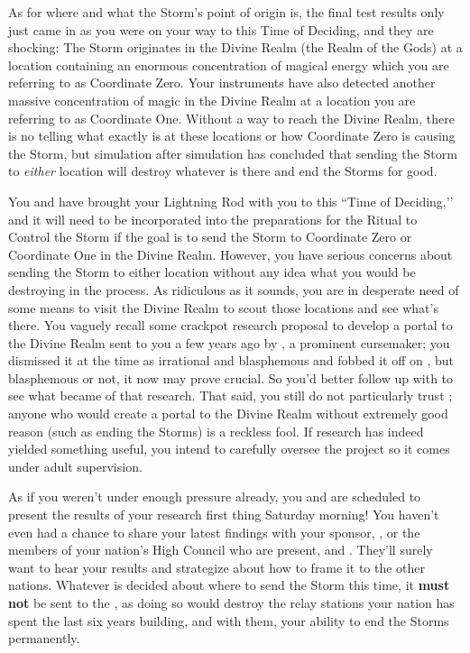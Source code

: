 \documentclass[char]{GL2020}
\begin{document}
As for where and what the Storm’s point of origin is, the final test results only just came in as you were on your way to this Time of Deciding, and they are shocking: The Storm originates in the Divine Realm (the Realm of the Gods) at a location containing an enormous concentration of magical energy which you are referring to as Coordinate Zero. Your instruments have also detected another massive concentration of magic in the Divine Realm at a location you are referring to as Coordinate One. Without a way to reach the Divine Realm, there is no telling what exactly is at these locations or how Coordinate Zero is causing the Storm, but simulation after simulation has concluded that sending the Storm to \emph{either} location will destroy whatever is there and end the Storms for good.

You and \cAssistantScientist{} have brought your Lightning Rod with you to this ``Time of Deciding,’’ and it will need to be incorporated into the preparations for the Ritual to Control the Storm if the goal is to send the Storm to Coordinate Zero or Coordinate One in the Divine Realm. However, you have serious concerns about sending the Storm to either location without any idea what you would be destroying in the process. As ridiculous as it sounds, you are in desperate need of some means to visit the Divine Realm to scout those locations and see what's there. You vaguely recall some crackpot research proposal to develop a portal to the Divine Realm sent to you a few years ago by \cCurse{\full}, a prominent cursemaker; you dismissed it at the time as irrational and blasphemous and fobbed it off on \cAssistantScientist{}, but blasphemous or not, it now may prove crucial. So you’d better follow up with \cAssistantScientist{\them} to see what became of that research. That said, you still do not particularly trust \cCurse{}; anyone who would create a portal to the Divine Realm without extremely good reason (such as ending the Storms) is a reckless fool. If \cCurse{\their} research has indeed yielded something useful, you intend to carefully oversee the project so it comes under adult supervision.

As if you weren't under enough pressure already, you and \cAssistantScientist{} are scheduled to present the results of your research first thing Saturday morning! You haven't even had a chance to share your latest findings with your sponsor, \cDiplomat{\full}, or the members of your nation's High Council who are present, \cAntiChup{\full} and \cTechStar{\full}. They’ll surely want to hear your results and strategize about how to frame it to the other nations. Whatever is decided about where to send the Storm this time, it \textbf{must not} be sent to the \pTech{}, as doing so would destroy the relay stations your nation has spent the last six years building, and with them, your ability to end the Storms permanently.
\end{document}
